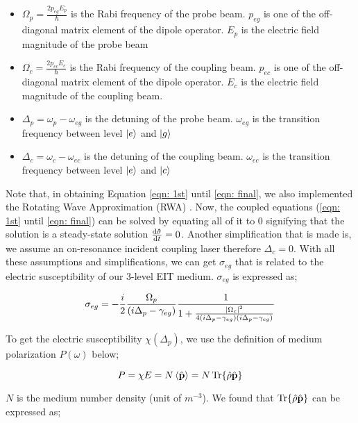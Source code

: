 \begin{itemize}
    \item $\Omega_{p} = \frac{2 p_{eg} E_{p}}{\hbar}$ is the Rabi frequency of the probe beam. $p_{eg}$ is one of the off-diagonal matrix element of the dipole operator. $E_{p}$ is the electric field magnitude of the probe beam
    \item $\Omega_{c} = \frac{2 p_{ec} E_{c}}{\hbar}$ is the Rabi frequency of the coupling beam. $p_{ec}$ is one of the off-diagonal matrix element of the dipole operator. $E_{c}$ is the electric field magnitude of the coupling beam.
    \item $\Delta_{p} = \omega_{p} - \omega_{eg}$ is the detuning of the probe beam. $\omega_{eg}$ is the transition frequency between level $\ket{e}$ and $\ket{g}$
    \item $\Delta_{c} = \omega_{c} - \omega_{ec}$ is the detuning of the coupling beam. $\omega_{ec}$ is the transition frequency between level $\ket{e}$ and $\ket{c}$
\end{itemize}

Note that, in obtaining Equation \ref{eqn: 1st} until \ref{eqn: final}, we also implemented the Rotating Wave Approximation (RWA) \cite{boyd2020nonlinear}. Now, the coupled equations (\ref{eqn: 1st} until \ref{eqn: final}) can be solved by equating all of it to $0$ signifying that the solution is a steady-state solution $\dv{\vb{\hat{\sigma}}}{t} = 0$. Another simplification that is made is, we assume an on-resonance incident coupling laser therefore $\Delta_{c} = 0$. With all these assumptions and simplifications, we can get $\sigma_{eg}$ that is related to the electric susceptibility of our 3-level EIT medium. $\sigma_{eg}$ is expressed as;

\begin{equation}
    \sigma_{eg} = - \frac{i}{2} \frac{\Omega_{p}}{(i \Delta_{p} - \gamma_{eg})} \frac{1}{1 + \frac{\abs{\Omega_{c}}^{2}}{4(i\Delta_{p} - \gamma_{eg})(i \Delta_{p} - \gamma_{cg})}}
    \label{eqn: sigmaeg}
\end{equation}

To get the electric susceptibility $\chi(\Delta_{p})$, we use the definition of medium polarization $P(\omega)$ below;

\begin{equation}
    P = \chi E = N \expval{\hat{\vb{p}}} = N \Tr{\hat{\vb{\rho}} \hat{\vb{p}}}
    \label{eqn: P}
\end{equation}

$N$ is the medium number density (unit of $m^{-3}$). We found that $\Tr{\hat{\vb{\rho}} \hat{\vb{p}}}$ can be expressed as;

